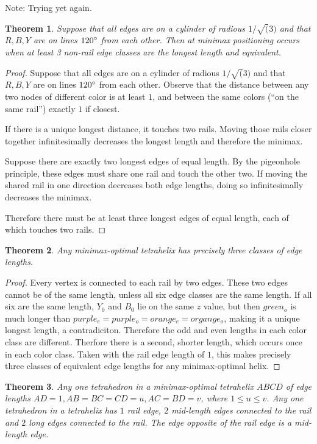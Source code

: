 \documentclass[11pt]{article}
\newtheorem{theorem}{Theorem}
\begin{document}
Note: Trying yet again.
\begin{theorem}
  Suppose that all edges are on a cylinder of radious $1/\sqrt(3)$ and that $R,B,Y$ are on lines $120\degree$ from each other.
  Then at minimax positioning occurs when at least 3 non-rail edge classes are the longest length and equivalent.
 \end{theorem}
\begin{proof}
  Suppose that all edges are on a cylinder of radious $1/\sqrt(3)$ and that $R,B,Y$ are on lines $120\degree$ from each other. Observe
  that the distance between any two nodes of different color is at least $1$, and between the same colors (``on the same rail'') exactly $1$ if closest.

  If there is a unique longest distance, it touches two rails. Moving those rails closer together infinitesimally decreases the longest length and
  therefore the minimax.

  Suppose there are exactly two longest edges of equal length. By the pigeonhole principle, these edges must share one rail and touch the other two.
  If moving the shared rail in one direction decreases both edge lengths, doing so infinitesimally decreases the minimax.

  Therefore there must be at least three longest edges of equal length, each of which touches two rails.
  \end{proof}

\begin{theorem}
  Any minimax-optimal tetrahelix has precisely three classes of edge lengths.
\end{theorem}

\begin{proof}
  Every vertex is connected to each rail by two edges. These two edges cannot be of the same length, unless all six edge classes are the same
  length. If all six are the same length, $Y_0$ and $B_0$ lie on the same $z$ value, but then $green_o$ is much longer than $purple_e = purple_o = orange_e = organge_o$,
  making it a unique longest length, a contradiciton. Therefore the odd and even lengths in each color class are different. Therfore there is a second,
  shorter length, which occurs once in each color class. Taken with the rail edge length of $1$, this makes precisely three classes of equivalent
  edge lengths for any minimax-optimal helix.
\end{proof}
  
\begin{theorem}
  Any one tetrahedron in a minimax-optimal tetrahelix $ABCD$ of edge lengths $AD = 1, AB = BC = CD = u , AC = BD = v$, where $1 \leq u \leq v$.
  Any one tetrahedron in a tetrahelix has $1$ rail edge, $2$ mid-length edges connected to the rail and $2$ long edges connected to the rail.
  The edge opposite of the rail edge is a mid-length edge.
\end{theorem}
\end{document}
